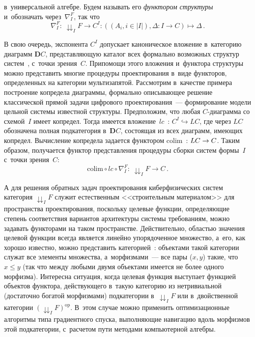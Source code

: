 \begin{multicols}{2}
\pagebreak

\noindent
 в~универсальной 
алгебре. Будем называть его \textit{функтором структуры} и~обозначать через~$\nabla_I^F$, 
так что 
$$
\nabla_I^F :\ \downdownarrows_I F \to C^I : ((A_i, i \in \vert I\vert), \Delta : I \to C) 
\mapsto \Delta \,.
$$


В свою очередь, экспонента $C^I$ допускает каноническое вложение 
в~категорию диаграмм \textbf{D}$C$, представляющую каталог всех 
формально возможных структур систем~\cite{12-kov}, с~точки зрения~$C$. 
При\linebreak помощи этого вложения и~функтора структуры можно представить многие 
процедуры проектирования в~виде функторов, определенных на категории 
мультизапятой. Рас\-смот\-рим в~качестве примера построение копредела 
диаграммы, формально опи\-сы\-ва\-ющее решение классической прямой задачи 
цифрового проектирования~--- формирование модели цельной системы 
известной структуры. Предположим, что любая $C$-диа\-грам\-ма со схемой~$I$ 
имеет копредел. Тогда имеется вложение~$lc$~: $C^I \hookrightarrow LC$, где 
через $LC$ обозначена полная подкатегория в~\textbf{D}$C$, состоящая из 
всех диаграмм, име\-ющих копредел. Вычисление копредела задается функтором 
colim~: $LC \hm\to C$. Таким образом, получается функтор пред\-став\-ле\-ния 
процедуры сборки сис\-тем формы~$I$ с~точ\-ки зрения~$C$:
$$
\mbox{colim}  \circ lc \circ \nabla_I^F :\ \downdownarrows_I F \to C\,.
$$


А для решения обратных задач проектирования киберфизических сис\-тем 
категория $\downdownarrows_I F$ служит естественным <<строительным 
материалом>> для пространства проектирования, поскольку целевые функции, 
определяющие степень соответствия вариантов архитектуры сис\-те\-мы 
требованиям, можно задавать функторами на таком пространстве. 
Действительно, областью значения целевой функции\linebreak
 всегда является линейно 
упорядоченное множество, а~его, как хорошо известно, можно представить  
категорией~\cite[\S\,I.2]{13-kov}: объектами такой\linebreak
 категории служат все 
элементы множества, а~морфизмами~--- все пары ($x, y$) такие, что $x \leq y$ 
(так что между любыми двумя объектами имеется не более одного морфизма). 
Интересна ситуация, когда целевая функция выступает функцией объектов 
функтора, действующего в~такую категорию из нетривиальной (достаточно 
богатой морфизмами) подкатегории в~$\downdownarrows_I F$ или 
в~двойственной категории $(\downdownarrows_I F)^{\mathrm{op}}$. В~этом 
случае можно применить оптимизационные алгоритмы типа градиентного 
спуска, выполняющие навигацию вдоль морфизмов этой подкатегории, 
с~расчетом пути методами компьютерной алгебры.


\end{multicols}

